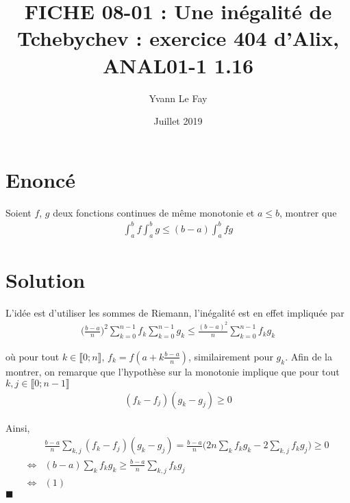 \documentclass{article}
\newcommand*{\QED}{\hfill\ensuremath{\blacksquare}}%
\begin{document}
\title{FICHE 08-01 : Une inégalité de Tchebychev : exercice 404 d'Alix, ANAL01-1 1.16}
\author{Yvann Le Fay}
\date{Juillet 2019}
\maketitle

\section*{Enoncé}
Soient $f$, $g$ deux fonctions continues de même monotonie et $a \leq b$, montrer que 
\begin{align*}
\int_{a}^b f\int_{a}^b g \leq (b-a)\int_{a}^b fg
\end{align*}
\section*{Solution}
L'idée est d'utiliser les sommes de Riemann, l'inégalité est en effet impliquée par 
\begin{align}
\bigg(\frac{b-a}{n}\bigg)^2\sum_{k=0}^{n-1} f_k \sum_{k=0}^{n-1} g_k \leq \frac{(b-a)^2}{n}\sum_{k=0}^{n-1} {f_k g_k}
\end{align}

où pour tout $k\in\llbracket 0;n\rrbracket$, $f_k = f(a+k\frac{b-a}{n})$, similairement pour $g_k$. Afin de la montrer, on remarque que l'hypothèse sur la monotonie implique que pour tout $k,j\in\llbracket 0;n-1\rrbracket$
\begin{align*}
(f_k-f_j)(g_k-g_j)\geq 0 
\end{align*}

Ainsi, 
\begin{align*}
&\frac{b-a}{n}\sum_{k,j}(f_k-f_j)(g_k-g_j) = \frac{b-a}{n}\bigg(2n\sum_k f_kg_k-2\sum_{k,j} f_kg_j\bigg) \geq 0\\
\Longleftrightarrow &(b-a)\sum_k f_kg_k \geq \frac{b-a}{n}\sum_{k,j}f_kg_j\\
\Longleftrightarrow & (1)
\end{align*}
\QED
\end{document}
